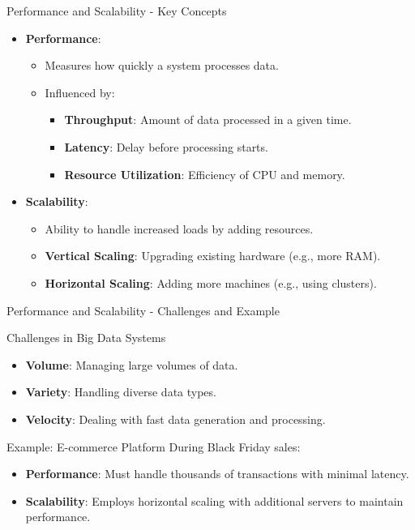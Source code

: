 \documentclass[aspectratio=169]{beamer}
\begin{document}
\begin{frame}[fragile]{Performance and Scalability - Key Concepts}
  \begin{itemize}
    \item \textbf{Performance}:
      \begin{itemize}
        \item Measures how quickly a system processes data.
        \item Influenced by:
          \begin{itemize}
            \item \textbf{Throughput}: Amount of data processed in a given time.
            \item \textbf{Latency}: Delay before processing starts.
            \item \textbf{Resource Utilization}: Efficiency of CPU and memory.
          \end{itemize}
      \end{itemize}
    \item \textbf{Scalability}:
      \begin{itemize}
        \item Ability to handle increased loads by adding resources.
        \item \textbf{Vertical Scaling}: Upgrading existing hardware (e.g., more RAM).
        \item \textbf{Horizontal Scaling}: Adding more machines (e.g., using clusters).
      \end{itemize}
  \end{itemize}
\end{frame}

\begin{frame}[fragile]{Performance and Scalability - Challenges and Example}
  \begin{block}{Challenges in Big Data Systems}
    \begin{itemize}
      \item \textbf{Volume}: Managing large volumes of data.
      \item \textbf{Variety}: Handling diverse data types.
      \item \textbf{Velocity}: Dealing with fast data generation and processing.
    \end{itemize}
  \end{block}
  
  \begin{block}{Example: E-commerce Platform}
    During Black Friday sales:
    \begin{itemize}
      \item \textbf{Performance}: Must handle thousands of transactions with minimal latency.
      \item \textbf{Scalability}: Employs horizontal scaling with additional servers to maintain performance.
    \end{itemize}
  \end{block}
\end{frame}
\end{document}
